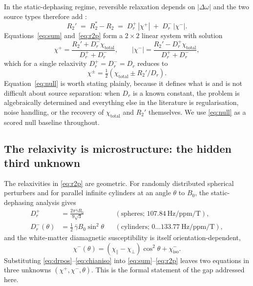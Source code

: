 \documentclass[AMA,STIX2COL,Linenumberson]{MRM}
\begin{document}
In the static-dephasing regime, reversible relaxation depends on $|\Delta\omega|$ and the two source types therefore add \cite{yablonskiy_theory_1994}:
\begin{equation}
R_2' \;=\; R_2^{*} - R_2 \;=\; D_r^{+}\,|\chi^{+}| \;+\; D_r^{-}\,|\chi^{-}| .
\label{eq:r2p}
\end{equation}
Equations~\eqref{eq:sum} and~\eqref{eq:r2p} form a $2\times2$ linear system with solution
\begin{equation}
\chi^{+} = \frac{R_2' + D_r^{-}\chi_{\mathrm{total}}}{D_r^{+}+D_r^{-}}, \qquad
|\chi^{-}| = \frac{R_2' - D_r^{+}\chi_{\mathrm{total}}}{D_r^{+}+D_r^{-}},
\label{eq:solve}
\end{equation}
which for a single relaxivity $D_r^{+}=D_r^{-}=D_r$ reduces to
\begin{equation}
\chi^{\pm} = \tfrac{1}{2}\left(\chi_{\mathrm{total}} \pm R_2'/D_r\right).
\label{eq:null}
\end{equation}
Equation~\eqref{eq:null} is worth stating plainly, because it defines what is and is not difficult about source separation: when $D_r$ is a known constant, the problem is algebraically determined and everything else in the literature is regularisation, noise handling, or the recovery of $\chi_{\mathrm{total}}$ and $R_2'$ themselves. We use \eqref{eq:null} as a scored null baseline throughout.

\subsection{The relaxivity is microstructure: the hidden third unknown}
\label{sec:theory-drneg}

The relaxivities in \eqref{eq:r2p} are geometric. For randomly distributed spherical perturbers and for parallel infinite cylinders at an angle $\theta$ to $B_0$, the static-dephasing analysis gives \cite{yablonskiy_theory_1994,brown_distribution_1961}
\begin{align}
D_r^{+} &= \frac{2\pi\bar\gamma B_0}{9\sqrt{3}} && (\text{spheres; } 107.84~\mathrm{Hz/ppm/T}), \label{eq:drpos}\\
D_r^{-}(\theta) &= \tfrac{1}{2}\,\bar\gamma B_0 \sin^{2}\theta && (\text{cylinders; } 0\ldots133.77~\mathrm{Hz/ppm/T}), \label{eq:drneg}
\end{align}
and the white-matter diamagnetic susceptibility is itself orientation-dependent,
\begin{equation}
\chi^{-}(\theta) = (\chi_{\parallel}-\chi_{\perp})\cos^{2}\theta + \chi^{-}_{\mathrm{iso}} .
\label{eq:chianiso}
\end{equation}
Substituting \eqref{eq:drpos}--\eqref{eq:chianiso} into \eqref{eq:sum}--\eqref{eq:r2p} leaves two equations in three unknowns $(\chi^{+},\chi^{-},\theta)$. This is the formal statement of the gap addressed here.
\end{document}
